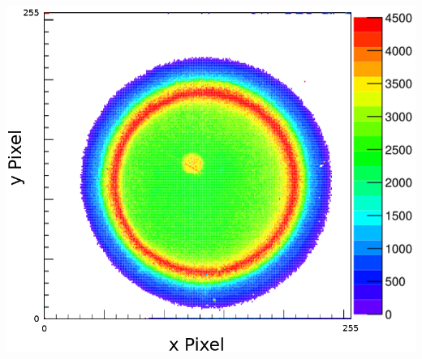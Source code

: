 \begin{frame}
\begin{columns}
\begin{column}{0.45\textwidth}
\begin{columns}
\begin{column}{0.45\textwidth}
        \end{column}
      \end{columns}
      \includegraphics[width=\textwidth]{04_Test/fig/fig000_IRMA_damage3.png}
    \end{column}
  \end{columns}
\end{frame}


